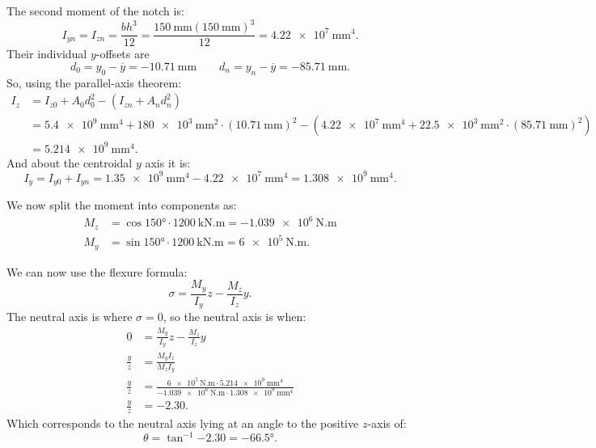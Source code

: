 \begin{derivation}
  The second moment of the notch is:
  \begin{equation*}
    I_{yn} = I_{zn} = \frac{bh^3}{12} = \frac{\qty{150}{\mm} \left( \qty{150}{\mm}  \right)^3}{12} = \qty{4.22e7}{\mm^4}
  .\end{equation*}
  Their individual $y$-offsets are
  \begin{equation*}
    d_0 = y_0 - \overline{y} = - \qty{10,71}{\mm} \qquad d_n = y_n - \overline{y} = - \qty{85,71}{\mm} 
  .\end{equation*}
  So, using the parallel-axis theorem:
  \begin{align*}
    I_{z} &= I_{z0} + A_0 d_0^2 - \left( I_{zn} + A_n d_n^2 \right) \\
    &= \qty{5,4e9}{\mm^{4}} + \qty{180e3}{\mm^2} \cdot \left( \qty{10,71}{\mm}  \right)^2 - \left( \qty{4,22e7}{\mm^{4}} + \qty{22,5e3}{\mm^2} \cdot \left( \qty{85,71}{\mm}  \right)^2 \right) \\
    &= \qty{5,214e9}{\mm^{4}} 
  .\end{align*}
  And about the centroidal $y$ axis it is:
  \begin{equation*}
    I_y = I_{y0} + I_{yn} = \qty{1,35e9}{\mm^{4}} -  \qty{4,22e7}{\mm^{4}} = \qty{1,308e9}{\mm^{4}} 
  .\end{equation*}

  We now split the moment into components as:
  \begin{align*}
    M_z &= \cos \ang{150} \cdot \qty{1200}{\kN.\m} = -\qty{1,039e6}{\N.\m} \\
    M_y &= \sin \ang{150} \cdot \qty{1200}{\kN.\m} = \qty{6e5}{\N.\m} 
  .\end{align*}

  We can now use the flexure formula:
  \begin{equation*}
    \sigma = \frac{M_y}{I_y}z - \frac{M_z}{I_z}y
  .\end{equation*}
  The neutral axis is where $\sigma = 0$, so the neutral axis is when:
  \begin{align*}
    0 &= \frac{M_y}{I_y}z - \frac{M_z}{I_z} y \\
    \frac{y}{z} &= \frac{M_y I_z}{M_z I_y} \\
    \frac{y}{z} &= \frac{ \qty{6e5}{\N.\m} \cdot \qty{5,214e9}{\mm^{4}}}{\qty{-1,039e6}{\N.\m} \cdot \qty{1,308e9}{\mm^{4}} } \\
    \frac{y}{z} &= \num{-2,30} 
  .\end{align*}
  Which corresponds to the neutral axis lying at an angle to the positive $z$-axis of:
  \begin{equation*}
    \theta = \tan^{-1} \num{-2,30} = \ang{-66,5} 
  .\end{equation*}
 

\end{derivation}
